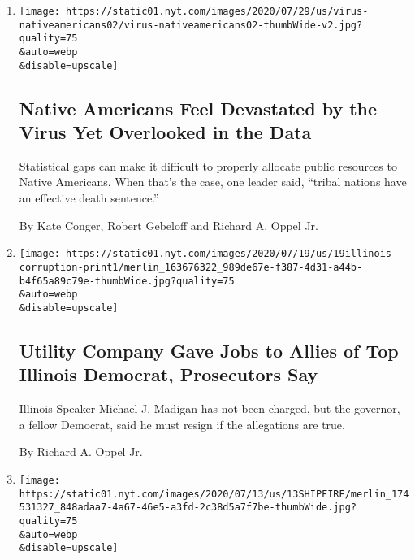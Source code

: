 \begin{enumerate}
\def\labelenumi{\arabic{enumi}.}
\item
  \href{/2020/07/30/us/native-americans-coronavirus-data.html}{}

  \texttt{[image: https://static01.nyt.com/images/2020/07/29/us/virus-nativeamericans02/virus-nativeamericans02-thumbWide-v2.jpg?quality=75\\\&auto=webp\\\&disable=upscale]}

  \hypertarget{native-americans-feel-devastated-by-the-virus-yet-overlooked-in-the-data}{%
  \subsection{Native Americans Feel Devastated by the Virus Yet
  Overlooked in the
  Data}\label{native-americans-feel-devastated-by-the-virus-yet-overlooked-in-the-data}}

  Statistical gaps can make it difficult to properly allocate public
  resources to Native Americans. When that's the case, one leader said,
  ``tribal nations have an effective death sentence.''

  By Kate Conger, Robert Gebeloff and Richard A. Oppel Jr.
\item
  \href{/2020/07/17/us/illinois-michael-madigan.html}{}

  \texttt{[image: https://static01.nyt.com/images/2020/07/19/us/19illinois-corruption-print1/merlin\_163676322\_989de67e-f387-4d31-a44b-b4f65a89c79e-thumbWide.jpg?quality=75\\\&auto=webp\\\&disable=upscale]}

  \hypertarget{utility-company-gave-jobs-to-allies-of-top-illinois-democrat-prosecutors-say}{%
  \subsection{Utility Company Gave Jobs to Allies of Top Illinois
  Democrat, Prosecutors
  Say}\label{utility-company-gave-jobs-to-allies-of-top-illinois-democrat-prosecutors-say}}

  Illinois Speaker Michael J. Madigan has not been charged, but the
  governor, a fellow Democrat, said he must resign if the allegations
  are true.

  By Richard A. Oppel Jr.
\item
  \href{/2020/07/13/us/naval-ship-fire-san-diego.html}{}

  \texttt{[image: https://static01.nyt.com/images/2020/07/13/us/13SHIPFIRE/merlin\_174531327\_848adaa7-4a67-46e5-a3fd-2c38d5a7f7be-thumbWide.jpg?quality=75\\\&auto=webp\\\&disable=upscale]}


\end{enumerate}
